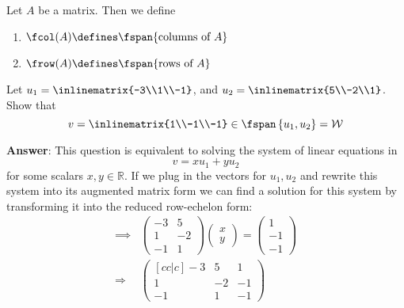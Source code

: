 \begin{definition}\label{def-matrix-cols-rows}
	Let $A$ be a matrix. Then we define
	\begin{enumerate}
		\item $\fcol(A)\defines\fspan\{\text{columns of }A\}$
		\item $\frow(A)\defines\fspan\{\text{rows of }A\}$
	\end{enumerate}
\end{definition}

\begin{exm}
	Let $u_1=\inlinematrix{-3\\1\\-1}$, and $u_2=\inlinematrix{5\\-2\\1}$. Show that
	\begin{equation*}
		v=\inlinematrix{1\\-1\\-1}\in\fspan\left\{u_1,u_2\right\}=\mathcal{W}
	\end{equation*}
	\begin{flushleft}
		\textbf{Answer}:
		This question is equivalent to solving the system of linear equations in
		\begin{equation*}
			v=x u_1 + y u_2
		\end{equation*}
		for some scalars $x,y\in\mathbb{R}$. If we plug in the vectors for $u_1,u_2$
		and rewrite this system into its augmented matrix form we can find a
		solution for this system by transforming it into the reduced row-echelon
		form:
		\begin{align*}
			\implies & \begin{pmatrix}
				-3 & 5  \\
				1  & -2 \\
				-1 & 1
			\end{pmatrix}
			\begin{pmatrix}
				x \\ y
			\end{pmatrix}=
			\begin{pmatrix}
				1  \\
				-1 \\
				-1
			\end{pmatrix}                            \\
			\Longrightarrow
			         & \begin{pmatrix}[cc|c]
				-3 & 5  & 1  \\
				1  & -2 & -1 \\
				-1 & 1  & -1

\end{pmatrix}
\end{align*}
\end{flushleft}
\end{exm}
